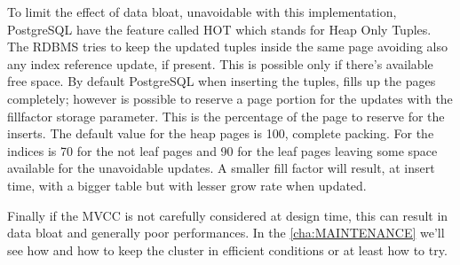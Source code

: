 To limit the effect of data bloat, unavoidable with this implementation,  PostgreSQL have the 
feature called HOT which stands for Heap Only Tuples. The RDBMS tries to keep 
the updated tuples inside the same page avoiding also any index reference update, if present. This 
is possible only if there's available free space. By default PostgreSQL when inserting the 
tuples, fills up the pages completely; however is possible to reserve a page portion for the 
updates with the fillfactor storage parameter. This is the 
percentage of the page to reserve for the inserts. The default value for the heap pages is 100, 
complete packing. For the indices is 70 for the not leaf pages and 90 for the leaf pages leaving 
some space available for the unavoidable updates. A smaller fill factor will result, at insert time, 
with a bigger table but with lesser grow rate when updated. \newline

Finally if the MVCC is not carefully considered at design time, this can result in data bloat and 
generally poor performances.
In the \ref{cha:MAINTENANCE} we'll see how and how to keep the cluster in efficient conditions or 
at least how to try.